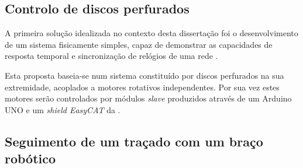 \subsection{Controlo de discos perfurados}

A primeira solução idealizada no contexto desta dissertação foi o 
desenvolvimento de um sistema fisicamente simples, capaz de demonstrar
as capacidades de resposta temporal e sincronização de relógios de uma
rede \ecat.

Esta proposta baseia-se num sistema constituído por discos perfurados
na sua extremidade, acoplados a motores rotativos independentes. Por sua
vez estes motores serão controlados por módulos \emph{slave} \ecat
produzidos através de um Arduino UNO \cite[]{arduino:ArduinoUNORev3} e 
um \emph{shield EasyCAT} da \cite{ABT:EasyCAT}.

\subsection{Seguimento de um traçado com um braço robótico}


